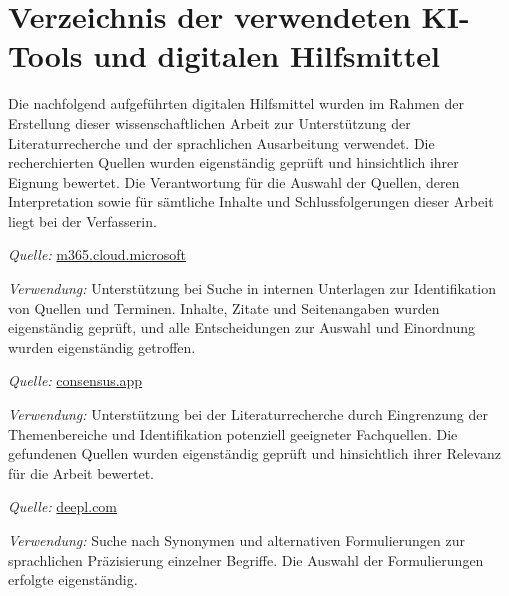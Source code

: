 \section*{Verzeichnis der verwendeten KI-Tools und digitalen Hilfsmittel}

Die nachfolgend aufgeführten digitalen Hilfsmittel wurden im Rahmen der Erstellung dieser
wissenschaftlichen Arbeit zur Unterstützung der Literaturrecherche und der sprachlichen
Ausarbeitung verwendet. Die recherchierten Quellen wurden eigenständig geprüft und
hinsichtlich ihrer Eignung bewertet. Die Verantwortung für die Auswahl der Quellen, deren
Interpretation sowie für sämtliche Inhalte und Schlussfolgerungen dieser Arbeit liegt bei
der Verfasserin.

\begin{description}[style=nextline, leftmargin=0pt, labelwidth=0pt]

    \item[Microsoft 365 Copilot (Microsoft)]
    \textit{Quelle:} \href{https://m365.cloud.microsoft}{m365.cloud.microsoft}\par
    \textit{Verwendung:} Unterstützung bei Suche in internen Unterlagen zur
    Identifikation von Quellen und Terminen. Inhalte, Zitate und Seitenangaben wurden eigenständig geprüft, und alle Entscheidungen zur Auswahl und Einordnung wurden
    eigenständig getroffen.

    \item[Consensus]
    \textit{Quelle:} \href{https://consensus.app}{consensus.app}\par
    \textit{Verwendung:} Unterstützung bei der Literaturrecherche durch
    Eingrenzung der Themenbereiche und Identifikation potenziell geeigneter
    Fachquellen. Die gefundenen Quellen wurden eigenständig geprüft und
    hinsichtlich ihrer Relevanz für die Arbeit bewertet.

    \item[DeepL]
    \textit{Quelle:} \href{https://www.deepl.com}{deepl.com}\par
    \textit{Verwendung:} Suche nach Synonymen und alternativen Formulierungen
    zur sprachlichen Präzisierung einzelner Begriffe. Die Auswahl der
    Formulierungen erfolgte eigenständig.

\end{description}
